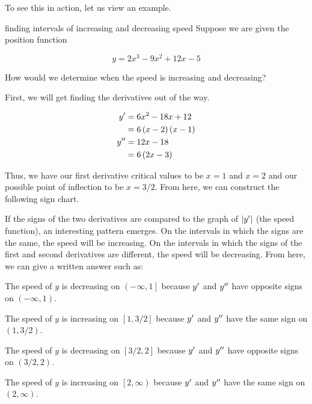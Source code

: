To see this in action, let us view an example.

\begin{example}{finding intervals of increasing and decreasing speed}
    Suppose we are given the position function
    
    \[ y = 2x^3 - 9x^2 + 12x - 5 \]
    
    How would we determine when the speed is increasing and decreasing?
    
    \vspace{0.3cm}
    
    First, we will get finding the derivatives out of the way.
    
    \begin{align}
        y^\prime &= 6x^2 - 18x + 12 \\
        &= 6 \left( x - 2 \right) \left( x - 1 \right) \\
        y^{\prime\prime} &= 12x - 18 \\
        &= 6 \left( 2x - 3 \right)
    \end{align}
    
    Thus, we have our first derivative critical values to be \( x = 1 \) and \( x = 2 \) and our possible point of inflection to be \( x = 3/2 \). From here, we can construct the following sign chart.
    
    \begin{figure}[H]
        \centering
        
    \end{figure}
    
    If the signs of the two derivatives are compared to the graph of \( \left\lvert {y^\prime} \right\rvert \) (the speed function), an interesting pattern emerges. On the intervals in which the signs are the same, the speed will be increasing. On the intervals in which the signs of the first and second derivatives are different, the speed will be decreasing. From here, we can give a written answer such as:
    
    \begin{center}
        The speed of \( y \) is decreasing on \( \left( -\infty, 1 \right] \) because \( y^\prime \) and \( y^{\prime\prime} \) have opposite signs on \( \left( -\infty, 1 \right) \).
        
        The speed of \( y \) is increasing on \( \left[ 1, 3/2 \right] \) because \( y^\prime \) and \( y^{\prime\prime} \) have the same sign on \( \left( 1, 3/2 \right) \).
        
        The speed of \( y \) is decreasing on \( \left[ 3/2, 2 \right] \) because \( y^\prime \) and \( y^{\prime\prime} \) have opposite signs on \( \left( 3/2, 2 \right) \).
        
        The speed of \( y \) is increasing on \( \left[ 2, \infty \right) \) because \( y^\prime \) and \( y^{\prime\prime} \) have the same sign on \( \left( 2, \infty \right) \).
    \end{center}
\end{example}

